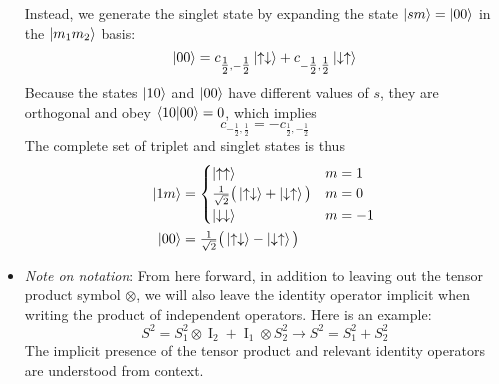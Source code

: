 \documentclass[11pt, a4paper]{article}
\newcommand{\ua}{\uparrow}  %
\newcommand{\da}{\downarrow}  %
\newcommand{\II}{\operatorname{I}}  %
\begin{document}
\begin{itemize}
    Instead, we generate the singlet state by expanding the state $ \ket{sm} = \ket{00} $ in the $ \ket{m_{1}m_{2}} $ basis:
    \begin{equation*}
        \ket{00} = c_{\tfrac{1}{2},-\tfrac{1}{2}} \ket{\ua\da} + c_{-\tfrac{1}{2}, \tfrac{1}{2}}\ket{\da \ua}
    \end{equation*}
    Because the states $ \ket{10} $ and $ \ket{00} $ have different values of $ s $, they are orthogonal and obey $ \braket{10}{00} = 0 $, which implies
    \begin{equation*}
        c_{-\tfrac{1}{2}, \tfrac{1}{2}} = - c_{\tfrac{1}{2}, -\tfrac{1}{2}}
    \end{equation*}
    The complete set of triplet and singlet states is thus
    \begin{align*}
        \ket{1m} &= 
        \begin{cases}
            \ket{\ua\ua} & m = 1\\
            \tfrac{1}{\sqrt{2}} \big( \ket{\ua\da} + \ket{\da\ua} \big) & m = 0\\
            \ket{\da\da} & m = -1
        \end{cases}\\
        \ket{00} &= \tfrac{1}{\sqrt{2}} \big( \ket{\ua\da} - \ket{\da \ua} \big)
    \end{align*}
   

    \item \textit{Note on notation}: From here forward, in addition to leaving out the tensor product symbol $ \otimes $, we will also leave the identity operator implicit when writing the product of independent operators. Here is an example:
    \begin{equation*}
        S^{2} = S_{1}^{2}\otimes\II_{2} + \II_{1} \otimes S_{2}^{2} \to S^{2} = S_{1}^{2} + S_{2}^{2}
    \end{equation*}
    The implicit presence of the tensor product and relevant identity operators are understood from context.
	
\end{itemize}
\end{document}
